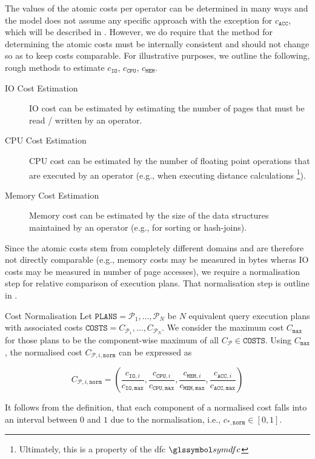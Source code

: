 The values of the atomic costs per operator can be determined in many ways and the model does not assume any specific approach with the exception for $c_{\mathtt{ACC}}$, which will be described in . However, we do require that the method for determining the atomic costs must be internally consistent and should not change so as to keep costs comparable. For illustrative purposes, we outline the following, rough methods to estimate $c_{\mathtt{IO}}$, $c_{\mathtt{CPU}}$, $c_{\mathtt{MEM}}$.

\begin{description}
    \item[IO Cost Estimation] IO cost can be estimated by estimating the number of pages that must be read / written by an operator. 
    \item[CPU Cost Estimation] CPU cost can be estimated by the number of floating point operations that are executed by an operator (e.g., when executing distance calculations \footnote{Ultimately, this is a property of the \acrshort{dfc} $\symdfc$}).
    \item[Memory Cost Estimation] Memory cost can be estimated by the size of the data structures maintained by an operator (e.g., for sorting or hash-joins).
\end{description}

Since the atomic costs stem from completely different domains and are therefore not directly comparable (e.g., memory costs may be measured in bytes wheras IO costs may be measured in number of page accesses), we require a normalisation step for relative comparison of execution plans. That normalisation step is outline in .

\begin{definition}[label=definition:cost_normalisation]{Cost Normalisation}{}
    Let $\mathtt{PLANS} = \mathcal{P}_1, \ldots, \mathcal{P}_N$ be $N$ equivalent query execution plans with associated costs $\mathtt{COSTS} =C_{\mathcal{P}_1}, \ldots,C_{\mathcal{P}_N}$. We consider the maximum cost $C_{\mathtt{max}}$ for those plans to be the component-wise maximum of all $C_{\mathcal{P}} \in \mathtt{COSTS}$. Using $C_{\mathtt{max}}$, the normalised cost $ C_{\mathcal{P},i,\mathtt{norm}}$ can be expressed as

    \begin{equation*}
        C_{\mathcal{P},i,\mathtt{norm}} = (\frac{c_{\mathtt{IO},i}}{c_{\mathtt{IO},\mathtt{max}}},\frac{c_{\mathtt{CPU},i}}{c_{\mathtt{CPU},\mathtt{max}}},\frac{c_{\mathtt{MEM},i}}{c_{\mathtt{MEM},\mathtt{max}}},\frac{c_{\mathtt{ACC},i}}{c_{\mathtt{ACC},\mathtt{max}}})
    \end{equation*}

    It follows from the definition, that each component of a normalised cost falls into an interval between $0$ and $1$ due to the normalisation, i.e., $c_{\mathtt{*},\mathtt{norm}} \in [ 0, 1 ]$.
\end{definition}

